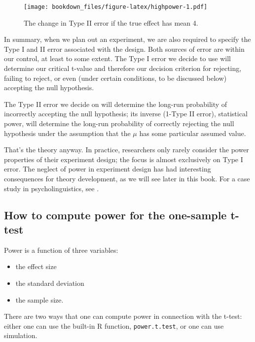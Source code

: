 \documentclass[12pt,]{krantz}
\providecommand{\tightlist}{%
  \setlength{\itemsep}{0pt}\setlength{\parskip}{0pt}}
\begin{document}
\begin{figure}
\centering
\texttt{[image: bookdown\_files/figure-latex/highpower-1.pdf]}
\caption{\label{fig:highpower}The change in Type II error if the true effect has mean 4.}
\end{figure}

In summary, when we plan out an experiment, we are also required to specify the Type I and II error associated with the design. Both sources of error are within our control, at least to some extent. The Type I error we decide to use will determine our critical t-value and therefore our decision criterion for rejecting, failing to reject, or even (under certain conditions, to be discussed below) accepting the null hypothesis.

The Type II error we decide on will determine the long-run probability of incorrectly accepting the null hypothesis; its inverse (1-Type II error), statistical power, will determine the long-run probability of correctly rejecting the null hypothesis under the assumption that the \(\mu\) has some particular assumed value.

That's the theory anyway. In practice, researchers only rarely consider the power properties of their experiment design; the focus is almost exclusively on Type I error. The neglect of power in experiment design has had interesting consequences for theory development, as we will see later in this book. For a case study in psycholinguistics, see \citet{VasishthMertzenJaegerGelman2018}.

\hypertarget{how-to-compute-power-for-the-one-sample-t-test}{%
\subsection{How to compute power for the one-sample t-test}\label{how-to-compute-power-for-the-one-sample-t-test}}

Power is a function of three variables:

\begin{itemize}
\tightlist
\item
  the effect size
\item
  the standard deviation
\item
  the sample size.
\end{itemize}

There are two ways that one can compute power in connection with the t-test: either one can use the built-in R function, \texttt{power.t.test}, or one can use simulation.
\end{document}

